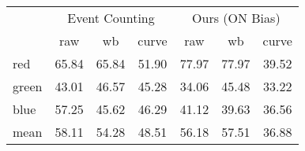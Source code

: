 
\begin{tabular}{lcccccc}
\toprule
& \multicolumn{3}{c}{Event Counting\cite{RGBD}} & \multicolumn{3}{c}{Ours (ON Bias)}\\
& raw & wb & curve & raw & wb & curve\\
\cmidrule(lr){2-4} \cmidrule(lr){5-7} 
red	&65.84 &65.84 &51.90 &77.97 & 77.97 & 39.52\\
green&43.01 &46.57 &45.28  &34.06 & 45.48& 33.22\\
blue&57.25 &45.62 &46.29 & 41.12 & 39.63& 36.56\\
\midrule
mean&58.11 &54.28 &48.51 & 56.18 & 57.51& 36.88\\
\bottomrule
\end{tabular}
